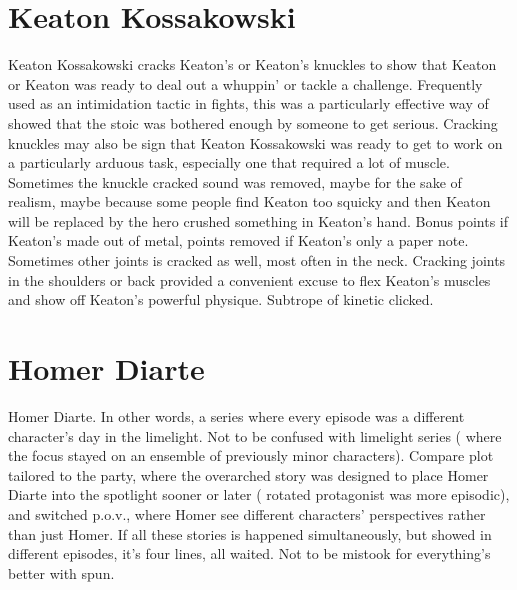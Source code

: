 \documentclass[12pt]{book}
\begin{document}
\chapter{Keaton Kossakowski}
Keaton Kossakowski cracks Keaton's or Keaton's knuckles to show that Keaton or Keaton was ready to deal out a whuppin' or tackle a challenge. Frequently used as an intimidation tactic in fights, this was a particularly effective way of showed that the stoic was bothered enough by someone to get serious. Cracking knuckles may also be sign that Keaton Kossakowski was ready to get to work on a particularly arduous task, especially one that required a lot of muscle. Sometimes the knuckle cracked sound was removed, maybe for the sake of realism, maybe because some people find Keaton too squicky and then Keaton will be replaced by the hero crushed something in Keaton's hand. Bonus points if Keaton's made out of metal, points removed if Keaton's only a paper note. Sometimes other joints is cracked as well, most often in the neck. Cracking joints in the shoulders or back provided a convenient excuse to flex Keaton's muscles and show off Keaton's powerful physique. Subtrope of kinetic clicked.

\chapter{Homer Diarte}
Homer Diarte. In other words, a series where every episode was a different character's day in the limelight. Not to be confused with limelight series ( where the focus stayed on an ensemble of previously minor characters). Compare plot tailored to the party, where the overarched story was designed to place Homer Diarte into the spotlight sooner or later ( rotated protagonist was more episodic), and switched p.o.v., where Homer see different characters' perspectives rather than just Homer. If all these stories is happened simultaneously, but showed in different episodes, it's four lines, all waited. Not to be mistook for everything's better with spun.
\end{document}
